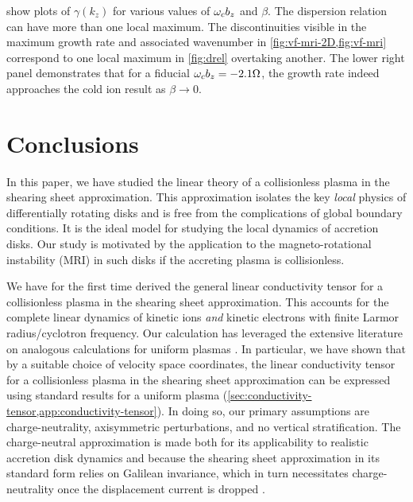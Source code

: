 \documentclass[aps,pre,notitlepage,amsmath,amssymb,amsfonts,nobibnotes,nofootinbib,superscriptaddress]{revtex4-1}
\begin{document}
 show plots of $\gamma(k_z)$ for various values of $\omega_c{}b_z$
and $\beta$. The dispersion relation can have more than one local maximum. The
discontinuities visible in the maximum growth rate and associated wavenumber
in \cref{fig:vf-mri-2D,fig:vf-mri} correspond to one local maximum in
\cref{fig:drel} overtaking another. The lower right panel demonstrates that
for a fiducial $\omega_c{}b_z=-2.1\Omega$, the growth rate indeed approaches the
cold ion result as $\beta\to0$.

\section{Conclusions}\label{sec:conclusions}

In this paper, we have studied the linear theory of a collisionless plasma in
the shearing sheet approximation. This approximation isolates the key
\emph{local} physics of differentially rotating disks and is free from the
complications of global boundary conditions. It is the ideal model for
studying the local dynamics of accretion disks. Our study is motivated by the
application to the magneto-rotational instability (MRI) in such disks if the
accreting plasma is collisionless.

We have for the first time derived the general linear conductivity tensor for
a collisionless plasma in the shearing sheet approximation. This accounts for
the complete linear dynamics of kinetic ions \emph{and} kinetic electrons with
finite Larmor radius/cyclotron frequency. Our calculation has leveraged the
extensive literature on analogous calculations for uniform plasmas
\citep{Ichimaru1973}. In particular, we have shown that by a suitable choice
of velocity space coordinates, the linear conductivity tensor for a
collisionless plasma in the shearing sheet approximation can be expressed
using standard results for a uniform plasma
(\cref{sec:conductivity-tensor,app:conductivity-tensor}). In doing so, our
primary assumptions are charge-neutrality, axisymmetric perturbations, and no
vertical stratification. The charge-neutral approximation is made both for its
applicability to realistic accretion disk dynamics and because the shearing
sheet approximation in its standard form relies on Galilean invariance, which
in turn necessitates charge-neutrality once the displacement current is
dropped \citep[see e.g.][]{Grad1966}.
\end{document}
